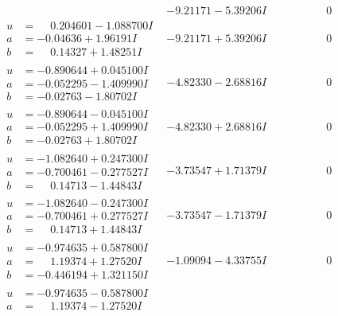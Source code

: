 \documentclass[1p]{elsarticle_modified}
\theoremstyle{definition}
\begin{document}
$$\begin{array}{c|c|c}
 & -9.21171 - 5.39206 I & \phantom{-0.000000 } 0 \\ \hline\begin{aligned}
u &= \phantom{-}0.204601 - 1.088700 I \\
a &= -0.04636 + 1.96191 I \\
b &= \phantom{-}0.14327 + 1.48251 I\end{aligned}
 & -9.21171 + 5.39206 I & \phantom{-0.000000 } 0 \\ \hline\begin{aligned}
u &= -0.890644 + 0.045100 I \\
a &= -0.052295 - 1.409990 I \\
b &= -0.02763 - 1.80702 I\end{aligned}
 & -4.82330 - 2.68816 I & \phantom{-0.000000 } 0 \\ \hline\begin{aligned}
u &= -0.890644 - 0.045100 I \\
a &= -0.052295 + 1.409990 I \\
b &= -0.02763 + 1.80702 I\end{aligned}
 & -4.82330 + 2.68816 I & \phantom{-0.000000 } 0 \\ \hline\begin{aligned}
u &= -1.082640 + 0.247300 I \\
a &= -0.700461 - 0.277527 I \\
b &= \phantom{-}0.14713 - 1.44843 I\end{aligned}
 & -3.73547 + 1.71379 I & \phantom{-0.000000 } 0 \\ \hline\begin{aligned}
u &= -1.082640 - 0.247300 I \\
a &= -0.700461 + 0.277527 I \\
b &= \phantom{-}0.14713 + 1.44843 I\end{aligned}
 & -3.73547 - 1.71379 I & \phantom{-0.000000 } 0 \\ \hline\begin{aligned}
u &= -0.974635 + 0.587800 I \\
a &= \phantom{-}1.19374 + 1.27520 I \\
b &= -0.446194 + 1.321150 I\end{aligned}
 & -1.09094 - 4.33755 I & \phantom{-0.000000 } 0 \\ \hline\begin{aligned}
u &= -0.974635 - 0.587800 I \\
a &= \phantom{-}1.19374 - 1.27520 I \\

\end{aligned}
\end{array}$$
\end{document}
